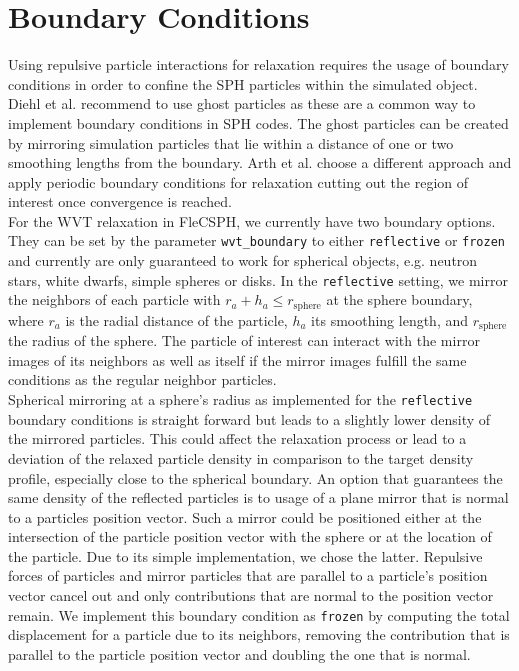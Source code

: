 \documentclass{article}
\begin{document}
\section{Boundary Conditions}
Using repulsive particle interactions for relaxation requires the usage of boundary conditions in order to confine the SPH particles within the simulated object. 
Diehl et al. recommend to use ghost particles as these are a common way to implement boundary conditions in SPH codes. 
The ghost particles can be created by mirroring simulation particles that lie within a distance of one or two smoothing lengths from the boundary. 
Arth et al. choose a different approach and apply periodic boundary conditions for relaxation cutting out the region of interest once convergence is reached. \\
For the WVT relaxation in FleCSPH, we currently have two boundary options.  
They can be set by the parameter \texttt{wvt\_boundary} to either \texttt{reflective} or \texttt{frozen} and currently are only guaranteed to work for spherical objects, e.g. neutron stars, white dwarfs, simple spheres or disks.
In the \texttt{reflective} setting, we mirror the neighbors of each particle with $r_a+h_a \leq r_\mathrm{sphere}$ at the sphere boundary, where $r_a$ is the radial distance of the particle, $h_a$ its smoothing length, and $r_\mathrm{sphere}$ the radius of the sphere. 
The particle of interest can interact with the mirror images of its neighbors as well as itself if the mirror images fulfill the same conditions as the regular neighbor particles.\\
Spherical mirroring at a sphere's radius as implemented for the \texttt{reflective} boundary conditions is straight forward but leads to a slightly lower density of the mirrored particles. 
This could affect the relaxation process or lead to a deviation of the relaxed particle density in comparison to the target density profile, especially close to the spherical boundary. 
An option that guarantees the same density of the reflected particles is to usage of a plane mirror that is normal to a particles position vector. 
Such a mirror could be positioned either at the intersection of the particle position vector with the sphere or at the location of the particle. 
Due to its simple implementation, we chose the latter. 
Repulsive forces of particles and mirror particles that are parallel to a particle's position vector cancel out and only contributions that are normal to the position vector remain. 
We implement this boundary condition as \texttt{frozen} by computing the total displacement for a particle due to its neighbors, removing the contribution that is parallel to the particle position vector and doubling the one that is normal.  
\end{document}
